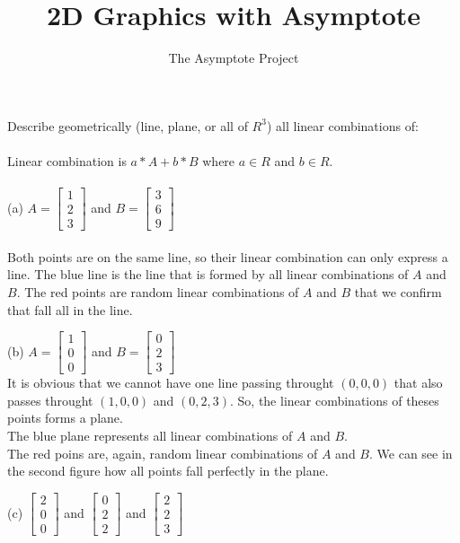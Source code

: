\documentclass[12pt]{article}
\title{2D Graphics with Asymptote}
\author{The Asymptote Project}
\newcommand{\insertrep}[1]{%
	\hspace*{-2.4cm}
	\fbox{\texttt{[image: \#1]}}

}
\begin{document}
Describe geometrically (line, plane, or all of $R^3$) all linear combinations of:\\\\
Linear combination is $a*A+b*B$ where $a \in R$ and $b \in R$.\\
\\
(a) $A = \begin{bmatrix}1\\2\\3\end{bmatrix}$ and $B = \begin{bmatrix}3\\6\\9\end{bmatrix}$\\
\\
Both points are on the same line, so their linear combination can only express a line. The blue line is the line that is formed by all linear combinations of $A$ and $B$. The red points are random linear combinations of $A$ and $B$ that we confirm that fall all in the line.\\
\begin{center}
\insertrep{exercise01001a.pdf}
\end{center}
\newpage
(b)  $A = \begin{bmatrix}1\\0\\0\end{bmatrix}$ and $B = \begin{bmatrix}0\\2\\3\end{bmatrix}$\\
It is obvious that we cannot have one line passing throught $(0,0,0)$ that also passes throught $(1,0,0)$ and $(0,2,3)$. So, the linear combinations of theses points forms a plane.\\
The blue plane represents all linear combinations of $A$ and $B$.\\
The red poins are, again, random linear combinations of $A$ and $B$. We can see in the second figure how all points fall perfectly in the plane.
\begin{center}
\insertrep{exercise01001b1.pdf}
\end{center}
\begin{center}
	\insertrep{exercise01001b2.pdf}
\end{center}
\newpage
(c) $\begin{bmatrix}2\\0\\0\end{bmatrix}$ and $\begin{bmatrix}0\\2\\2\end{bmatrix}$ and $\begin{bmatrix}2\\2\\3\end{bmatrix}$\\
\begin{center}
	\insertrep{exercise01001c1.pdf}
\end{center}
\begin{center}
	\insertrep{exercise01001c2.pdf}
\end{center}
\end{document}
